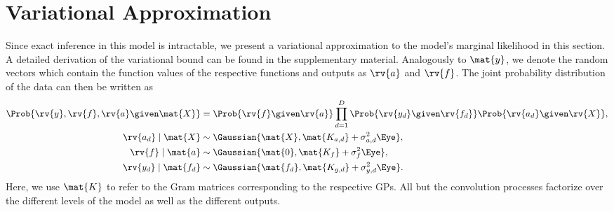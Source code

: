 \documentclass{article}
\begin{document}
\section{Variational Approximation}
\label{sec:variational_approximation}
Since exact inference in this model is intractable, we present a variational approximation to the model's marginal likelihood in this section.
A detailed derivation of the variational bound can be found in the supplementary material.
Analogously to $\mat{y}$, we denote the random vectors which contain the function values of the respective functions and outputs as $\rv{a}$ and $\rv{f}$.
The joint probability distribution of the data can then be written as
\begin{align}
\begin{split}
    \label{eq:full_model}
    \Prob{\rv{y}, \rv{f}, \rv{a} \given \mat{X}} &=
    \Prob{\rv{f} \given \rv{a}} \prod_{d=1}^D \Prob{\rv{y_d} \given \rv{f_d}}\Prob{\rv{a_d} \given \rv{X}}, \\
    \rv{a_d} \mid \mat{X} &\sim \Gaussian{\mat{X}, \mat{K_{a, d}} + \sigma^2_{a, d}\Eye}, \\
    \rv{f} \mid \mat{a} &\sim \Gaussian{\mat{0}, \mat{K_f} + \sigma^2_f\Eye}, \\
    \rv{y_d} \mid \mat{f_d} &\sim \Gaussian{\mat{f_d}, \mat{K_{g, d}} + \sigma^2_{y, d}\Eye}.
\end{split}
\end{align}
Here, we use $\mat{K}$ to refer to the Gram matrices corresponding to the respective GPs.
All but the convolution processes factorize over the different levels of the model as well as the different outputs.
\end{document}
